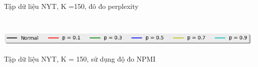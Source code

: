 \documentclass[pdf]{beamer}
\begin{document}
\begin{frame}{Tập dữ liệu NYT, K =150, đô đo perplexity}
\begin{columns}[T]
\begin{column}{.50\textwidth}
\begin{figure}
\end{figure}				
\end{column} %
\end{columns}
\begin{center}
\includegraphics[width=1\textwidth]{menu.png}	
\end{center}
\end{frame}

\begin{frame}{Tập dữ liệu NYT, K = 150, sử dụng độ đo NPMI }
\begin{columns}[T] %
\begin{column}{.50\textwidth}
\begin{figure}
\end{figure}
\end{column} %
\hfill%
\begin{column}{.50\textwidth}
\begin{figure}

\end{figure}
\end{column}
\end{columns}
\end{frame}
\end{document}
